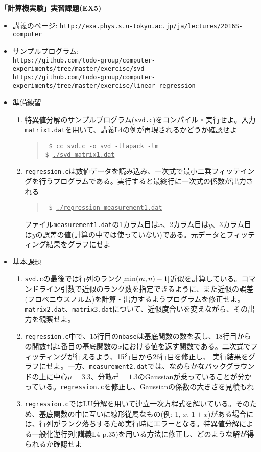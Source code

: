 \documentclass[11pt]{jarticle}
\begin{document}
\noindent
{\bf\large 「計算機実験」実習課題(EX5)}
\\[-0.5em]

\noindent
\begin{itemize}
\item 講義のページ: \verb+http://exa.phys.s.u-tokyo.ac.jp/ja/lectures/2016S-computer+

\item サンプルプログラム: \\ {\small \verb+https://github.com/todo-group/computer-experiments/tree/master/exercise/svd+}
   \\ {\small \verb+https://github.com/todo-group/computer-experiments/tree/master/exercise/linear_regression+}
  
\item 準備練習
  \begin{enumerate}
  \item 特異値分解のサンプルプログラム({\tt svd.c})をコンパイル・実行せよ。入力{\tt matrix1.dat}を用いて、講義L4の例が再現されるかどうか確認せよ
    \begin{quote} \tt
      \$ \underline{cc svd.c -o svd -llapack -lm} \\
      \$ \underline{./svd matrix1.dat}
    \end{quote}
  \item {\tt regression.c}は数値データを読み込み、一次式で最小二乗フィッテイングを行うプログラムである。実行すると最終行に一次式の係数が出力される
    \begin{quote} \tt
      \$ \underline{./regression measurement1.dat}
    \end{quote}
    ファイル{\tt measurement1.dat}の1カラム目は$x$、2カラム目は$y$、3カラム目は$y$の誤差の値(計算の中では使っていない)である。元データとフィッティング結果をグラフにせよ
  \end{enumerate}

\item 基本課題
  \begin{enumerate}
  \item {\tt svd.c}の最後では行列のランク$[{\rm min}(m,n)-1]$近似を計算している。コマンドライン引数で近似のランク数を指定できるように、また近似の誤差(フロベニウスノルム)を計算・出力するようプログラムを修正せよ。{\tt matrix2.dat}、{\tt matrix3.dat}について、近似度合いを変えながら、その出力を観察せよ。
  \item {\tt regression.c}中で、15行目の{\tt nbase}は基底関数の数を表し、18行目からの関数{\tt f}は{\tt i}番目の基底関数の$x$における値を返す関数である。二次式でフィッティングが行えるよう、15行目から26行目を修正し、
実行結果をグラフにせよ。一方、{\tt measurement2.dat}では、なめらかなバックグラウンドの上に中心$\mu=3.3$、分散$\sigma^2=1.3$のGaussianが乗っていることが分かっている。{\tt regression.c}を修正し、Gaussianの係数の大きさを見積もれ
  \item {\tt regression.c}ではLU分解を用いて連立一次方程式を解いている。そのため、基底関数の中に互いに線形従属なもの(例: 1, $x$, $1+x$)がある場合には、行列がランク落ちするため実行時にエラーとなる。特異値分解による一般化逆行列(講義L4 p.35)を用いる方法に修正し、どのような解が得られるか確認せよ
  \end{enumerate}


\end{itemize}
\end{document}
